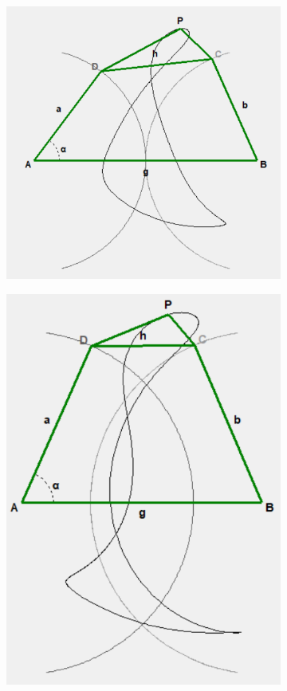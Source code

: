 \documentclass{article}
\begin{document}
\begin{figure}[h]
\begin{subfigure}{0.19\textwidth}
		\caption{}
	\end{subfigure}
	\hfill
	\begin{subfigure}{0.19\textwidth}
		\centering
		\includegraphics[width=\linewidth, height=0.95\linewidth, keepaspectratio]{./Figures/27_motion_cases/11-1.png}
		\caption{}
	\end{subfigure}
	\hfill
	\begin{subfigure}{0.19\textwidth}
		\centering
		\includegraphics[width=\linewidth, height=0.95\linewidth, keepaspectratio]{./Figures/27_motion_cases/01-1.png}

\end{subfigure}
\end{figure}
\end{document}
